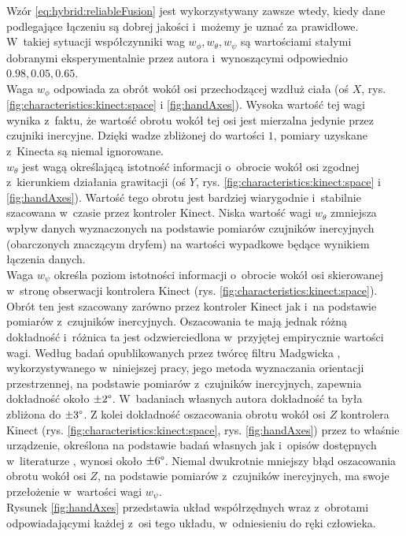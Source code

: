 Wzór \ref{eq:hybrid:reliableFusion} jest wykorzystywany zawsze wtedy, kiedy dane podlegające łączeniu są dobrej jakości i~możemy je uznać za prawidłowe. W~takiej sytuacji współczynniki wag $w_\phi , w_\theta , w_\psi$ są wartościami stałymi dobranymi eksperymentalnie przez autora i~wynoszącymi odpowiednio $0.98,0.05,0.65$.\\
Waga $w_\phi$ odpowiada za obrót wokół osi przechodzącej wzdłuż ciała (oś $X$, rys. \ref{fig:characteristics:kinect:space} i \ref{fig:handAxes}). Wysoka wartość tej wagi wynika z~faktu, że wartość obrotu wokół tej osi jest mierzalna jedynie przez czujniki inercyjne. Dzięki wadze zbliżonej do wartości $1$, pomiary uzyskane z~Kinecta są niemal ignorowane.\\
$w_\theta$ jest wagą określającą istotność informacji o~obrocie wokół osi zgodnej z~kierunkiem działania grawitacji (oś $Y$, rys. \ref{fig:characteristics:kinect:space} i \ref{fig:handAxes}). Wartość tego obrotu jest bardziej wiarygodnie i~stabilnie szacowana w~czasie przez kontroler Kinect. Niska wartość wagi $w_\theta$ zmniejsza wpływ danych wyznaczonych na podstawie pomiarów czujników inercyjnych (obarczonych znaczącym dryfem) na wartości wypadkowe będące wynikiem łączenia danych.\\ 
Waga $w_\psi$ określa poziom istotności informacji o~obrocie wokół osi skierowanej w~stronę obserwacji kontrolera Kinect (rys. \ref{fig:characteristics:kinect:space}). Obrót ten jest szacowany zarówno przez kontroler Kinect jak i~na podstawie pomiarów z~czujników inercyjnych. Oszacowania te mają jednak różną dokładność i~różnica ta jest odzwierciedlona w~przyjętej empirycznie wartości wagi. Według badań opublikowanych przez twórcę filtru Madgwicka \cite{Madgwick2010}, wykorzystywanego w~niniejszej pracy, jego metoda wyznaczania orientacji przestrzennej, na podstawie pomiarów z~czujników inercyjnych, zapewnia dokładność około $\pm2\degree$. W~badaniach własnych autora dokładność ta była zbliżona do $\pm3\degree$. Z kolei dokładność oszacowania obrotu wokół osi $Z$ kontrolera Kinect (rys. \ref{fig:characteristics:kinect:space}, rys. \ref{fig:handAxes}) przez to właśnie urządzenie, określona na podstawie badań własnych jak i~opisów dostępnych w~literaturze \cite{Huber2015}, wynosi około $\pm6\degree$. Niemal dwukrotnie mniejszy błąd oszacowania obrotu wokół osi $Z$, na podstawie pomiarów z~czujników inercyjnych, ma swoje przełożenie w~wartości wagi $w_\psi$.\\
Rysunek \ref{fig:handAxes} przedstawia układ współrzędnych wraz z~obrotami odpowiadającymi każdej z~osi tego układu, w~odniesieniu do ręki człowieka.
										
